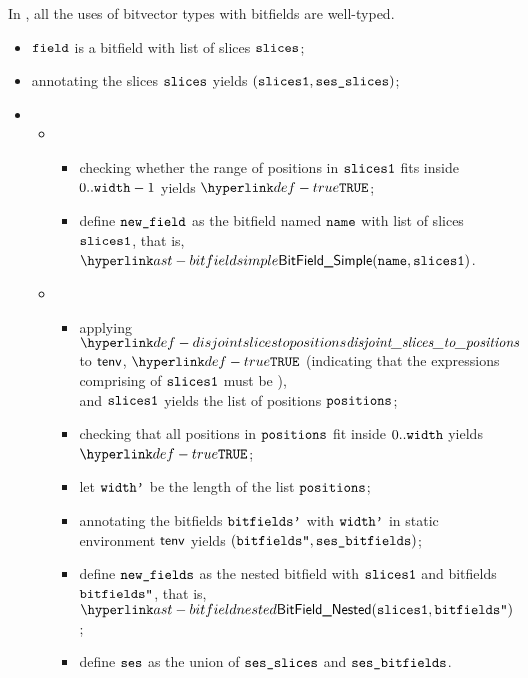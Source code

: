 In , all the uses of bitvector types with bitfields are well-typed.

\ProseParagraph
\begin{itemize}
  \item $\texttt{field}$ is a bitfield with list of slices $\texttt{slices}$;
  \item annotating the slices $\texttt{slices}$ yields $(\texttt{slices1}, \texttt{ses\_slices})$\ProseOrTypeError;
  \item \OneApplies
  \begin{itemize}
    \item {}
    \begin{itemize}
      \item checking whether the range of positions in $\texttt{slices1}$ fits inside $0..\texttt{width}-1$ yields $\True$\ProseOrTypeError;
      \item define $\texttt{new\_field}$ as the bitfield named $\texttt{name}$ with list of slices $\texttt{slices1}$, that is, $\BitFieldSimple(\name, \slicesone)$.
    \end{itemize}

    \item {}
    \begin{itemize}
      \item applying $\disjointslicestopositions$ to $\textsf{tenv}$,
            $\True$ (indicating that the expressions comprising of $\texttt{slices1}$ must be \staticallyevaluable), \\
            and $\texttt{slices1}$
            yields the list of positions $\texttt{positions}$\ProseOrTypeError;
      \item checking that all positions in $\texttt{positions}$ fit inside $0..\texttt{width}$ yields \\
            $\True$\ProseOrTypeError;
      \item let $\texttt{width'}$ be the length of the list $\texttt{positions}$;
      \item annotating the bitfields $\texttt{bitfields'}$ with $\texttt{width'}$ in static environment $\textsf{tenv}$ yields $ (\texttt{bitfields''}, \texttt{ses\_bitfields})$\ProseOrTypeError;
      \item define $\texttt{new\_fields}$ as the nested bitfield with $\texttt{slices1}$ and bitfields \\
            $\texttt{bitfields''}$, that is, $\BitFieldNested(\slicesone, \bitfieldspp)$;
      \item define $\texttt{ses}$ as the union of $\texttt{ses\_slices}$ and $\texttt{ses\_bitfields}$.
    \end{itemize}


\end{itemize}
\end{itemize}
